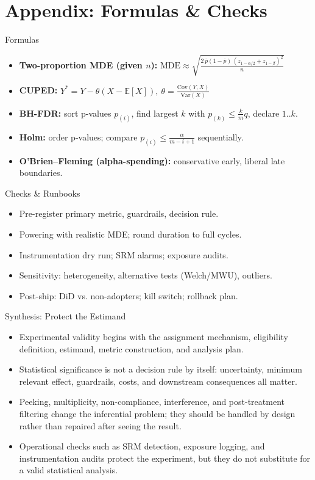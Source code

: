 \documentclass[aspectratio=169]{beamer}
\begin{document}
\section{Appendix: Formulas \& Checks}
\begin{frame}{Formulas}
\small
\begin{itemize}
  \item \textbf{Two-proportion MDE (given $n$):}
  \(\displaystyle \mathrm{MDE} \approx \sqrt{\frac{2\,\bar{p}(1-\bar{p})\,(z_{1-\alpha/2}+z_{1-\beta})^2}{n}}\)
  \item \textbf{CUPED:} \( Y^* = Y - \theta(X-\mathbb{E}[X]),\ \theta=\frac{\mathrm{Cov}(Y,X)}{\mathrm{Var}(X)} \)
  \item \textbf{BH-FDR:} sort p-values $p_{(i)}$, find largest $k$ with $p_{(k)} \leq \frac{k}{m}q$, declare $1..k$.
  \item \textbf{Holm:} order p-values; compare $p_{(i)} \leq \frac{\alpha}{m-i+1}$ sequentially.
  \item \textbf{O'Brien--Fleming (alpha-spending):} conservative early, liberal late boundaries.
\end{itemize}
\end{frame}

\begin{frame}{Checks \& Runbooks}
\small
\begin{itemize}
  \item Pre-register primary metric, guardrails, decision rule.
  \item Powering with realistic MDE; round duration to full cycles.
  \item Instrumentation dry run; SRM alarms; exposure audits.
  \item Sensitivity: heterogeneity, alternative tests (Welch/MWU), outliers.
  \item Post-ship: DiD vs. non-adopters; kill switch; rollback plan.
\end{itemize}
\end{frame}

\begin{frame}{Synthesis: Protect the Estimand}
  \begin{itemize}
    \item Experimental validity begins with the assignment mechanism, eligibility definition, estimand, metric construction, and analysis plan.
    \item Statistical significance is not a decision rule by itself: uncertainty, minimum relevant effect, guardrails, costs, and downstream consequences all matter.
    \item Peeking, multiplicity, non-compliance, interference, and post-treatment filtering change the inferential problem; they should be handled by design rather than repaired after seeing the result.
    \item Operational checks such as SRM detection, exposure logging, and instrumentation audits protect the experiment, but they do not substitute for a valid statistical analysis.
  \end{itemize}
\end{frame}
\end{document}
